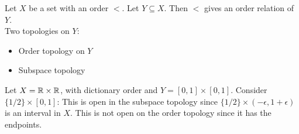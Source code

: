 \begin{example*}{}{}
    Let $X$ be a set with an order $<$. Let $Y \subseteq X$. Then $<$ gives an order relation of $Y$.\\
    Two topologies on $Y$:
    \begin{itemize}
        \item Order topology on $Y$
        \item Subspace topology
    \end{itemize}
\end{example*}
{
Let $X=\mathbb{R} \times \mathbb{R}$, with dictionary order and $Y=[0,1] \times [0,1]$. Consider $\{1/2\} \times [0,1]$: This is open in the subspace topology since $\{1/2\} \times (-\epsilon, 1+\epsilon)$ is an interval in $X$.
This is not open on the order topology since it has the endpoints.
}